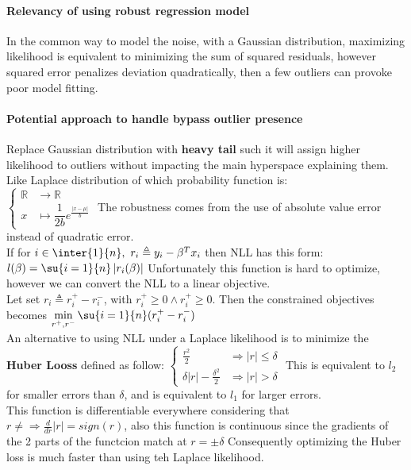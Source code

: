 \paragraph{Relevancy of using robust regression model}
In the common way to model the noise, with a Gaussian distribution, maximizing likelihood is equivalent to minimizing the sum of squared residuals, however squared error penalizes
deviation quadratically, then a few outliers can provoke poor model fitting.
\paragraph{Potential approach to handle bypass outlier presence}
Replace Gaussian distribution with \textbf{heavy tail} such it will assign higher 
likelihood to outliers without impacting the main hyperspace explaining them.
Like Laplace distribution of which probability function is:\\
$\begin{cases}
    \mathbb{R} & \longrightarrow \mathbb{R}\\
    x & \longmapsto \dfrac{1}{2b}e^{\frac{\left| x-\mu\right|}{b}}
\end{cases}$
The robustness comes from the use of absolute value error instead of quadratic error.\\
If for $i \in \inter{1}{n},~r_{i} \triangleq y_{i} - \beta^{T}x_{i}$ then NLL has this 
form: $l(\beta) = \su{i=1}{n}\left|r_{i}(\beta)\right|$
Unfortunately this function is hard to optimize, however we can convert the NLL to a 
linear objective.\\
Let set $r_{i} \triangleq r^{+}_{i} - r^{-}_{i}$, with $r^{+}_{i} \geq 0 \wedge
r^{+}_{i}\geq 0$.
Then the constrained objectives becomes $\displaystyle\min_{r^{+}, r^{-}}\su{i=1}{n}
(r^{+}_{i} - r^{-}_{i})$\\
An alternative to using NLL under a Laplace likelihood is to minimize the \textbf{Huber 
Looss} defined as follow:
$
\begin{cases}
    \frac{r^{2}}{2} & \Rightarrow |r| \leq \delta\\
    \delta |r|-\frac{\delta^{2}}{2} & \Rightarrow |r| > \delta
\end{cases}
$
This is equivalent to $l_{2}$ for smaller errors than $\delta$, and is equivalent to 
$l_{1}$ for larger errors.\\
This function is differentiable everywhere considering that 
$r\neq \Rightarrow \frac{d}{dr}|r| = sign(r)$, also this function is continuous since 
the gradients of the 2 parts of the functcion match at $r=\pm \delta$
Consequently optimizing the Huber loss is much faster than using teh Laplace likelihood.



